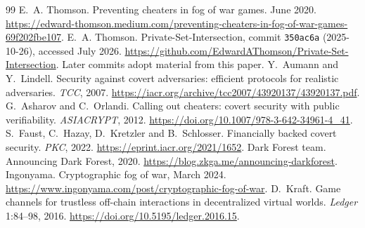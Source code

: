 \documentclass[11pt]{article}
\begin{document}
\begin{thebibliography}{99}
 E.~A. Thomson. Preventing cheaters in fog of war games.
June 2020.
\url{https://edward-thomson.medium.com/preventing-cheaters-in-fog-of-war-games-69f202fbe107}.
 E.~A. Thomson. Private-Set-Intersection, commit
\texttt{350ac6a} (2025-10-26), accessed July 2026.
\url{https://github.com/EdwardAThomson/Private-Set-Intersection}. Later
commits adopt material from this paper.
 Y.~Aumann and Y.~Lindell. Security against covert adversaries:
efficient protocols for realistic adversaries. \emph{TCC}, 2007.
\url{https://iacr.org/archive/tcc2007/43920137/43920137.pdf}.
 G.~Asharov and C.~Orlandi. Calling out cheaters: covert
security with public verifiability. \emph{ASIACRYPT}, 2012.
\url{https://doi.org/10.1007/978-3-642-34961-4_41}.
 S.~Faust, C.~Hazay, D.~Kretzler and B.~Schlosser.
Financially backed covert security. \emph{PKC}, 2022.
\url{https://eprint.iacr.org/2021/1652}.
 Dark Forest team. Announcing Dark Forest, 2020.
\url{https://blog.zkga.me/announcing-darkforest}.
 Ingonyama. Cryptographic fog of war, March 2024.
\url{https://www.ingonyama.com/post/cryptographic-fog-of-war}.
 D.~Kraft. Game channels for trustless off-chain interactions
in decentralized virtual worlds. \emph{Ledger} 1:84--98, 2016.
\url{https://doi.org/10.5195/ledger.2016.15}.
\end{thebibliography}
\end{document}
